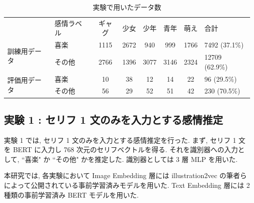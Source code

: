 \begin{table}[!ht]
\begin{center}
\caption{実験で用いたデータ数} %
\label{table:data_exp} %
\begin{tabular}{llccccc|l}
\hline
\multirow{2}{*}{}       & \multirow{2}{*}{感情ラベル} & \multirow{2}{*}{ギャグ} & \multirow{2}{*}{少女} & \multirow{2}{*}{少年} & \multirow{2}{*}{青年} & \multirow{2}{*}{萌え} & \multirow{2}{*}{合計} \\
                        &                        &                      &                     &                     &                     &                     &                     \\ \hline
\multirow{2}{*}{訓練用データ} & 喜楽                     & 1115                 & 2672                & 940                 & 999                 & 1766                & 7492 (37.1\%)       \\
                        & その他                    & 2766                 & 1396                & 3077                & 3146                & 2324                & 12709 (62.9\%)      \\ \hline
\multirow{2}{*}{評価用データ} & 喜楽                     & 10                   & 38                  & 12                  & 14                  & 22                  & 96 (29.5\%)         \\
                        & その他                    & 56                   & 29                  & 52                  & 51                  & 42                  & 230 (70.5\%)
\end{tabular}
\end{center}
\end{table}


\changeindent{0cm}
\subsection{実験 1 : セリフ 1 文のみを入力とする感情推定}
\changeindent{2cm}

実験 1 では, セリフ 1 文のみを入力とする感情推定を行った.
まず, セリフ 1 文を BERT に入力し 768 次元のセリフベクトルを得る.
それを識別器への入力として, ``喜楽" か ``その他" かを推定した.
識別器としては 3 層 MLP を用いた.

本研究では, 各実験において Image Embedding 層には illustration2vec の筆者らによって公開されている事前学習済みモデルを用いた. Text Embedding 層には 2 種類の事前学習済み BERT モデルを用いた.

